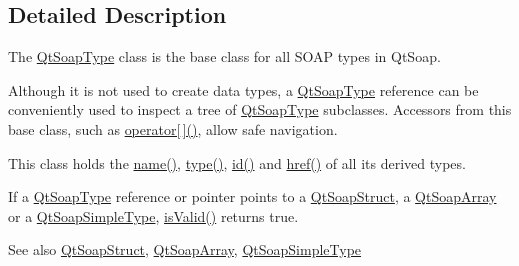 \subsection{Detailed Description}
The \mbox{\hyperlink{class_qt_soap_type}{Qt\+Soap\+Type}} class is the base class for all S\+O\+AP types in Qt\+Soap. 

Although it is not used to create data types, a \mbox{\hyperlink{class_qt_soap_type}{Qt\+Soap\+Type}} reference can be conveniently used to inspect a tree of \mbox{\hyperlink{class_qt_soap_type}{Qt\+Soap\+Type}} subclasses. Accessors from this base class, such as \mbox{\hyperlink{class_qt_soap_type_a3b8735f02d9628294bb3f2c6f4fbae20}{operator\mbox{[}$\,$\mbox{]}()}}, allow safe navigation.




This class holds the \mbox{\hyperlink{class_qt_soap_type_a6d5fb3d1ea4cf6d1432c7f62a5da09c3}{name()}}, \mbox{\hyperlink{class_qt_soap_type_acd4282b8a4b6a709c3504cc976335fba}{type()}}, \mbox{\hyperlink{class_qt_soap_type_a77376306cd4807467b3d97ff8ce68ff5}{id()}} and \mbox{\hyperlink{class_qt_soap_type_a47872406cda4698fc49b7fd5817bbd71}{href()}} of all its derived types.

If a \mbox{\hyperlink{class_qt_soap_type}{Qt\+Soap\+Type}} reference or pointer points to a \mbox{\hyperlink{class_qt_soap_struct}{Qt\+Soap\+Struct}}, a \mbox{\hyperlink{class_qt_soap_array}{Qt\+Soap\+Array}} or a \mbox{\hyperlink{class_qt_soap_simple_type}{Qt\+Soap\+Simple\+Type}}, \mbox{\hyperlink{class_qt_soap_type_a3b659f89a768ca3503fc86086bb987f6}{is\+Valid()}} returns true.

\begin{DoxySeeAlso}{See also}
\mbox{\hyperlink{class_qt_soap_struct}{Qt\+Soap\+Struct}}, \mbox{\hyperlink{class_qt_soap_array}{Qt\+Soap\+Array}}, \mbox{\hyperlink{class_qt_soap_simple_type}{Qt\+Soap\+Simple\+Type}} 
\end{DoxySeeAlso}



